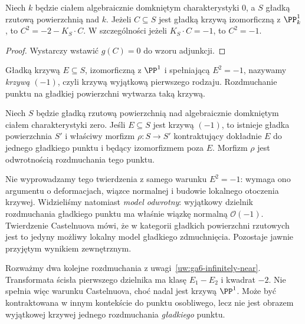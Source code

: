 \begin{wniosek}
\label{wn:ga6-rational-adjunction}
Niech $k$ będzie ciałem algebraicznie domkniętym
charakterystyki $0$, a $S$ gładką rzutową powierzchnią
nad $k$. Jeżeli $C\subseteq S$ jest gładką krzywą
izomorficzną z $\PP^1_k$, to
$C^2=-2-K_S\cdot C$.
W szczególności jeżeli $K_S\cdot C=-1$, to $C^2=-1$.
\end{wniosek}
\begin{proof}
Wystarczy wstawić $g(C)=0$ do wzoru adjunkcji.
\end{proof}

\begin{definicja}
Gładką krzywą $E\subseteq S$, izomorficzną z
$\PP^1$ i spełniającą $E^2=-1$, nazywamy
\emph{krzywą $(-1)$}, czyli krzywą wyjątkową
pierwszego rodzaju. Rozdmuchanie punktu na gładkiej
powierzchni wytwarza taką krzywą.
\end{definicja}

\begin{twierdzenie}
\label{tw:ga6-castelnuovo}
Niech $S$ będzie gładką rzutową powierzchnią nad
algebraicznie domkniętym ciałem charakterystyki zero.
Jeśli $E\subseteq S$ jest krzywą $(-1)$, to istnieje
gładka powierzchnia $S'$ i właściwy morfizm
$\rho:S\to S'$ kontraktujący dokładnie $E$ do jednego
gładkiego punktu i będący izomorfizmem poza $E$.
Morfizm $\rho$ jest odwrotnością rozdmuchania tego punktu.
\end{twierdzenie}

\begin{uwaga}
Nie wyprowadzamy tego twierdzenia z samego warunku
$E^2=-1$: wymaga ono argumentu o deformacjach,
wiązce normalnej i budowie lokalnego otoczenia krzywej.
Widzieliśmy natomiast \emph{model odwrotny}: wyjątkowy
dzielnik rozdmuchania gładkiego punktu ma właśnie
wiązkę normalną $\mathcal O(-1)$. Twierdzenie
Castelnuova mówi, że w kategorii gładkich powierzchni
rzutowych jest to jedyny możliwy lokalny model
gładkiego zdmuchnięcia. Pozostaje jawnie przyjętym
wynikiem zewnętrznym.
\end{uwaga}

\begin{przyklad}
Rozważmy dwa kolejne rozdmuchania z
uwagi~\ref{uw:ga6-infinitely-near}. Transformata
ścisła pierwszego dzielnika ma klasę $E_1-E_2$
i kwadrat $-2$. Nie spełnia więc warunku
Castelnuova, choć nadal jest krzywą $\PP^1$.
Może być kontraktowana w innym kontekście do
punktu osobliwego, lecz nie jest obrazem wyjątkowej
krzywej jednego rozdmuchania \emph{gładkiego} punktu.
\end{przyklad}

